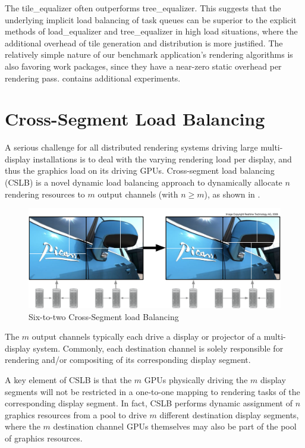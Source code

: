 The \textsf{tile\_equalizer} often outperforms \textsf{tree\_equalizer}. This
suggests that the underlying implicit load balancing of task queues can be
superior to the explicit methods of \textsf{load\_equalizer} and
\textsf{tree\_equalizer} in high load situations, where the additional overhead
of tile generation and distribution is more justified. The relatively simple
nature of our benchmark application's rendering algorithms is also favoring
work packages, since they have a near-zero static overhead per rendering pass.
\cite{SPEP:16} contains additional experiments.

\section{Cross-Segment Load Balancing}

A serious challenge for all distributed rendering systems driving large
multi-display installations is to deal with the varying rendering load per
display, and thus the graphics load on its driving GPUs. Cross-segment load
balancing (CSLB) is a novel dynamic load balancing approach to dynamically
allocate $n$ rendering resources to $m$ output channels (with $n\geq m$), as
shown in .

\begin{figure}[h!t]
  \includegraphics[width=\textwidth]{images/vieweq}
  \caption{\label{fvieweq}Six-to-two Cross-Segment load Balancing}
\end{figure}

The $m$ output channels typically each drive a display or projector of a
multi-display system. Commonly, each destination channel is solely responsible
for rendering and/or compositing of its corresponding display segment.

A key element of CSLB is that the $m$ GPUs physically driving the $m$ display
segments will not be restricted in a one-to-one mapping to rendering tasks of
the corresponding display segment. In fact, CSLB performs dynamic assignment of
$n$ graphics resources from a pool to drive $m$ different destination display
segments, where the $m$ destination channel GPUs themselves may also be part of
the pool of graphics resources.

